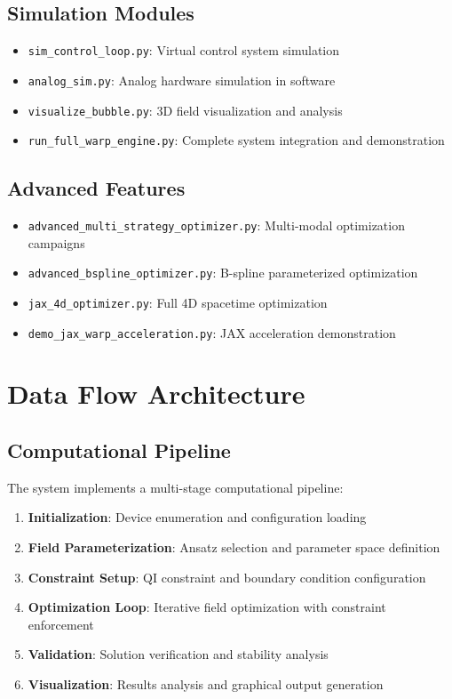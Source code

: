 \documentclass{article}
\begin{document}
\subsection{Simulation Modules}

\begin{itemize}
\item \texttt{sim\_control\_loop.py}: Virtual control system simulation
\item \texttt{analog\_sim.py}: Analog hardware simulation in software
\item \texttt{visualize\_bubble.py}: 3D field visualization and analysis
\item \texttt{run\_full\_warp\_engine.py}: Complete system integration and demonstration
\end{itemize}

\subsection{Advanced Features}

\begin{itemize}
\item \texttt{advanced\_multi\_strategy\_optimizer.py}: Multi-modal optimization campaigns
\item \texttt{advanced\_bspline\_optimizer.py}: B-spline parameterized optimization
\item \texttt{jax\_4d\_optimizer.py}: Full 4D spacetime optimization
\item \texttt{demo\_jax\_warp\_acceleration.py}: JAX acceleration demonstration
\end{itemize}

\section{Data Flow Architecture}

\subsection{Computational Pipeline}

The system implements a multi-stage computational pipeline:

\begin{enumerate}
\item \textbf{Initialization}: Device enumeration and configuration loading
\item \textbf{Field Parameterization}: Ansatz selection and parameter space definition
\item \textbf{Constraint Setup}: QI constraint and boundary condition configuration
\item \textbf{Optimization Loop}: Iterative field optimization with constraint enforcement
\item \textbf{Validation}: Solution verification and stability analysis
\item \textbf{Visualization}: Results analysis and graphical output generation
\end{enumerate}
\end{document}
